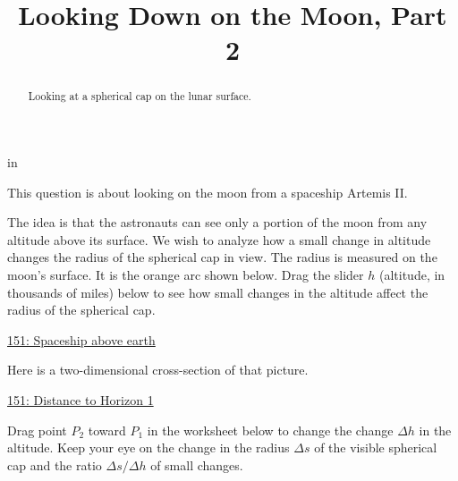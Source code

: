 \documentclass{ximera}
\title{Looking Down on the Moon, Part 2}
\newcommand{\pskip}{\vskip 0.1 in}
\begin{document}
\begin{abstract}
Looking at a spherical cap on the lunar surface.
\end{abstract}
\maketitle


\pskip



\begin{question}  \label{QKdf3Dfdrler33}

This question is about looking on the moon from a spaceship Artemis II.

The idea is that the astronauts can see only a portion of the moon from any altitude above its surface. We wish to analyze how a small change in altitude changes the radius of the spherical cap in view. The radius is measured on the moon's surface. It is the orange arc shown below. Drag the slider $h$ (altitude, in thousands of miles) below to see how small changes in the altitude affect the radius of the spherical cap.

\begin{onlineOnly}
    \begin{center}
\end{center}
\end{onlineOnly}

\href{https://www.desmos.com/3d/paqpozwuxm}{151: Spaceship above earth}

Here is a two-dimensional cross-section of that picture.

\begin{onlineOnly}
    \begin{center}
\end{center}
\end{onlineOnly}

\href{https://www.desmos.com/calculator/b5c4c7ba17}{151: Distance to Horizon 1}

Drag point $P_2$ toward $P_1$ in the worksheet below to change the change $\Delta h$ in the altitude. Keep your eye on the change in the radius $\Delta s$ of the visible spherical cap and the ratio $\Delta s/\Delta h$ of small changes.

\begin{onlineOnly}
    \begin{center}
\end{center}
\end{onlineOnly}


\end{question}
\end{document}
